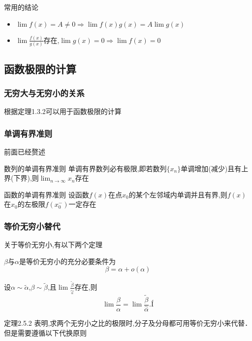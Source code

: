 \documentclass[12pt, a4paper, oneside, UTF8]{ctexbook}  %
\begin{document}
\begin{lemma}{常用的结论}{}
    \begin{itemize}
        \item $\lim f(x)=A \neq 0 \Rightarrow \lim f(x)g(x)=A \lim g(x)$
        \item $\lim \frac{f(x)}{g(x)}$存在,$\lim g(x)=0 \Rightarrow \lim f(x)=0$
    \end{itemize}
\end{lemma}
\subsection{函数极限的计算}
\subsubsection{无穷大与无穷小的关系}
根据定理1.3.2可以用于函数极限的计算
\subsubsection{单调有界准则}
前面已经赘述
\begin{them}{数列的单调有界准则}{}
    单调有界数列必有极限,即若数列$\{x_n\}$单调增加(减少)且有上界(下界),则$\lim_{n \to \infty} x_n$存在
\end{them}

\begin{them}{函数的单调有界准则}{}
    设函数$f(x)$在点$x_0$的某个左邻域内单调并且有界,则$f(x)$在$x_0$的左极限$f(x_0^-)$一定存在
\end{them}
\subsubsection{等价无穷小替代}
关于等价无穷小,有以下两个定理
\begin{them}{}{}
    $\beta$与$\alpha$是等价无穷小的充分必要条件为
    $$
        \beta=\alpha + o(\alpha)
    $$
\end{them}

\begin{them}{}{}
    设$\alpha\sim\widetilde{\alpha}$,$\beta\sim\widetilde{\beta}$,且$\lim\frac{\widetilde{\beta}}{\underset{\alpha}{\operatorname*{\sim}}}$存在,则
    $$
        \lim\frac{\beta}{\alpha}=\lim\frac{\widetilde{\beta}}{\overset{\sim}{\alpha}}.Í
    $$
\end{them}
定理2.5.2 表明,求两个无穷小之比的极限时,分子及分母都可用等价无穷小来代替．但是需要遵循以下代换原则
\end{document}
